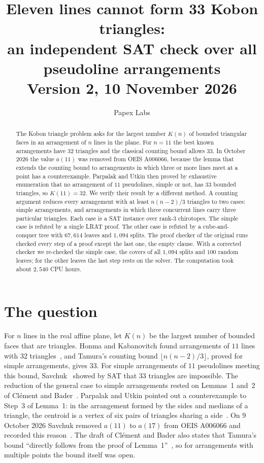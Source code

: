 \documentclass[11pt]{article}
\title{Eleven lines cannot form 33 Kobon triangles:\\ an independent SAT check over all pseudoline arrangements\\[4pt]
\large Version 2, 10 November 2026}
\author{Papex Labs}
\date{}
\theoremstyle{definition}
\theoremstyle{remark}
\begin{document}
\maketitle

\begin{abstract}
The Kobon triangle problem asks for the largest number $K(n)$ of bounded triangular faces in an
arrangement of $n$ lines in the plane. For $n = 11$ the best known arrangements have $32$ triangles
and the classical counting bound allows $33$. In October 2026 the value $a(11)$ was removed from
OEIS A006066, because the lemma that extends the counting bound to arrangements in which three or
more lines meet at a point has a counterexample. Parpalak and Utkin then proved by exhaustive
enumeration that no arrangement of $11$ pseudolines, simple or not, has $33$ bounded triangles, so
$K(11) = 32$. We verify their result by a different method. A counting argument reduces every
arrangement with at least $n(n-2)/3$ triangles to two cases: simple arrangements, and arrangements
in which three concurrent lines carry three particular triangles. Each case is a SAT instance over
rank-$3$ chirotopes. The simple case is refuted by a single LRAT proof. The other case is refuted
by a cube-and-conquer tree with $67{,}614$ leaves and $1{,}094$ splits. The proof checker of the
original runs checked every step of a proof except the last one, the empty clause. With a corrected
checker we re-checked the simple case, the covers of all $1{,}094$ splits and $100$ random leaves;
for the other leaves the last step rests on the solver. The computation took about $2{,}540$ CPU
hours.
\end{abstract}

\section{The question}

For $n$ lines in the real affine plane, let $K(n)$ be the largest number of bounded faces that are
triangles. Honma and Kabanovitch found arrangements of $11$ lines with $32$ triangles~\cite{oeis},
and Tamura's counting bound $\lfloor n(n-2)/3 \rfloor$, proved for simple arrangements, gives
$33$. For simple
arrangements of $11$ pseudolines meeting this bound, Savchuk~\cite{savchuk} showed by SAT that $33$
triangles are impossible. The reduction of the general case to simple arrangements rested on
Lemmas~1 and~2 of Cl\'ement and Bader~\cite{cb}. Parpalak and Utkin pointed out a counterexample to
Step~3 of Lemma~1: in the arrangement formed by the sides and medians of a triangle, the centroid is
a vertex of six pairs of triangles sharing a side~\cite{oeis}. On 9 October 2026 Savchuk removed
$a(11)$ to $a(17)$ from OEIS A006066 and recorded this reason~\cite{oeis}. The draft of Cl\'ement
and Bader also states that Tamura's bound ``directly follows from the proof of Lemma~1''~\cite{cb},
so for arrangements with multiple points the bound itself was open.
\end{document}
